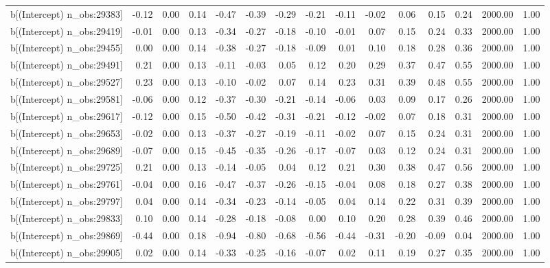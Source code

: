\begin{table}[ht]
\begin{tabular}{rrrrrrrrrrrrrrr}
  b[(Intercept) n\_obs:29383] & -0.12 & 0.00 & 0.14 & -0.47 & -0.39 & -0.29 & -0.21 & -0.11 & -0.02 & 0.06 & 0.15 & 0.24 & 2000.00 & 1.00 \\ 
  b[(Intercept) n\_obs:29419] & -0.01 & 0.00 & 0.13 & -0.34 & -0.27 & -0.18 & -0.10 & -0.01 & 0.07 & 0.15 & 0.24 & 0.33 & 2000.00 & 1.00 \\ 
  b[(Intercept) n\_obs:29455] & 0.00 & 0.00 & 0.14 & -0.38 & -0.27 & -0.18 & -0.09 & 0.01 & 0.10 & 0.18 & 0.28 & 0.36 & 2000.00 & 1.00 \\ 
  b[(Intercept) n\_obs:29491] & 0.21 & 0.00 & 0.13 & -0.11 & -0.03 & 0.05 & 0.12 & 0.20 & 0.29 & 0.37 & 0.47 & 0.55 & 2000.00 & 1.00 \\ 
  b[(Intercept) n\_obs:29527] & 0.23 & 0.00 & 0.13 & -0.10 & -0.02 & 0.07 & 0.14 & 0.23 & 0.31 & 0.39 & 0.48 & 0.55 & 2000.00 & 1.00 \\ 
  b[(Intercept) n\_obs:29581] & -0.06 & 0.00 & 0.12 & -0.37 & -0.30 & -0.21 & -0.14 & -0.06 & 0.03 & 0.09 & 0.17 & 0.26 & 2000.00 & 1.00 \\ 
  b[(Intercept) n\_obs:29617] & -0.12 & 0.00 & 0.15 & -0.50 & -0.42 & -0.31 & -0.21 & -0.12 & -0.02 & 0.07 & 0.18 & 0.31 & 2000.00 & 1.00 \\ 
  b[(Intercept) n\_obs:29653] & -0.02 & 0.00 & 0.13 & -0.37 & -0.27 & -0.19 & -0.11 & -0.02 & 0.07 & 0.15 & 0.24 & 0.31 & 2000.00 & 1.00 \\ 
  b[(Intercept) n\_obs:29689] & -0.07 & 0.00 & 0.15 & -0.45 & -0.35 & -0.26 & -0.17 & -0.07 & 0.03 & 0.12 & 0.24 & 0.31 & 2000.00 & 1.00 \\ 
  b[(Intercept) n\_obs:29725] & 0.21 & 0.00 & 0.13 & -0.14 & -0.05 & 0.04 & 0.12 & 0.21 & 0.30 & 0.38 & 0.47 & 0.56 & 2000.00 & 1.00 \\ 
  b[(Intercept) n\_obs:29761] & -0.04 & 0.00 & 0.16 & -0.47 & -0.37 & -0.26 & -0.15 & -0.04 & 0.08 & 0.18 & 0.27 & 0.38 & 2000.00 & 1.00 \\ 
  b[(Intercept) n\_obs:29797] & 0.04 & 0.00 & 0.14 & -0.34 & -0.23 & -0.14 & -0.05 & 0.04 & 0.14 & 0.22 & 0.31 & 0.39 & 2000.00 & 1.00 \\ 
  b[(Intercept) n\_obs:29833] & 0.10 & 0.00 & 0.14 & -0.28 & -0.18 & -0.08 & 0.00 & 0.10 & 0.20 & 0.28 & 0.39 & 0.46 & 2000.00 & 1.00 \\ 
  b[(Intercept) n\_obs:29869] & -0.44 & 0.00 & 0.18 & -0.94 & -0.80 & -0.68 & -0.56 & -0.44 & -0.31 & -0.20 & -0.09 & 0.04 & 2000.00 & 1.00 \\ 
  b[(Intercept) n\_obs:29905] & 0.02 & 0.00 & 0.14 & -0.33 & -0.25 & -0.16 & -0.07 & 0.02 & 0.11 & 0.19 & 0.27 & 0.35 & 2000.00 & 1.00 \\ 

\end{tabular}
\end{table}
